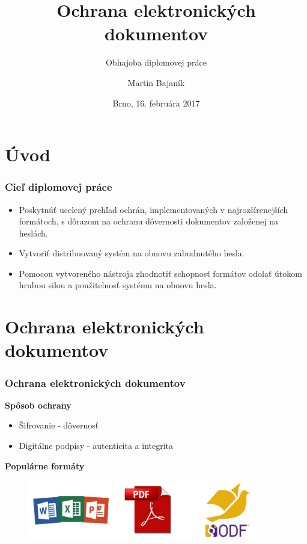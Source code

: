 \documentclass[xcolor=dvipsnames]{beamer}
\subtitle{Obhajoba diplomovej práce}
\title[Ochrana elektronických dokumentov]{Ochrana elektronických dokumentov}
\author[Martin Bajaník]{Martin Bajaník}
\institute[FI MU]{Fakulta informatiky\\Masarykova univerzita\\\texttt{martin.bajanik@gmail.com}}
\date[10. 2. 2017]{Brno, 16. februára 2017}
\def\itemtitle#1{{\bfseries#1\smallskip}}
\begin{document}

\section{Úvod}
\begin{frame}
  \titlepage
\end{frame}



\begin{frame}
	\frametitle{Cieľ diplomovej práce}	
	\begin{itemize}
		\item Poskytnúť ucelený prehľad ochrán, implementovaných v najrozšírenejších formátoch, s dôrazom na ochranu dôvernosti dokumentov založenej na heslách. 
		\item Vytvoriť distribuovaný systém na obnovu zabudnutého hesla.
		\item Pomocou vytvoreného nástroja zhodnotiť schopnosť formátov odolať útokom hrubou silou a použitelnosť systému na obnovu hesla.  
	\end{itemize}
	
\end{frame}


\section{Ochrana elektronických dokumentov}
\begin{frame}\frametitle{Ochrana elektronických dokumentov}
	\itemtitle{Spôsob ochrany}
	\begin{itemize}
		\item Šifrovanie - dôvernosť
		\item Digitálne podpisy - autenticita a integrita
	\end{itemize}
	\bigskip
	\itemtitle{Populárne formáty}
	\begin{figure}[h]
		\centering
		\includegraphics[width=100mm]{images/docs_logos.pdf} \\
		\vspace{-1mm}		
	\end{figure}
\end{frame}
\end{document}
